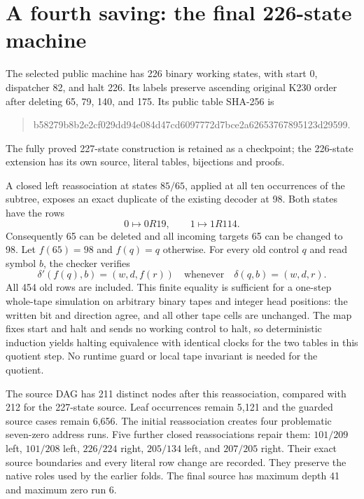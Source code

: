 \section{A fourth saving: the final 226-state machine}
\label{sec:native226}

The selected public machine has 226 binary working states, with start 0,
dispatcher 82, and halt 226.  Its labels preserve ascending original K230 order
after deleting 65, 79, 140, and 175.  Its public table SHA-256 is
\begin{quote}\small\ttfamily
b58279b8b2e2cf029dd94e084d47cd6097772d7bce2a62653767895123d29599.
\end{quote}
The fully proved 227-state construction is retained as a checkpoint; the
226-state extension has its own source, literal tables, bijections and proofs.

A closed left reassociation at states $85/65$, applied at all ten occurrences
of the subtree, exposes an exact duplicate of the existing decoder at 98.
Both states have the rows
\[
 0\longmapsto 0R19,\qquad 1\longmapsto1R114.
\]
Consequently 65 can be deleted and all incoming targets 65 can be changed to
98.  Let $f(65)=98$ and $f(q)=q$ otherwise.  For every old control $q$ and read
symbol $b$, the checker verifies
\[
 \delta'(f(q),b)=(w,d,f(r))
 \quad\text{whenever}\quad \delta(q,b)=(w,d,r).
\]
All 454 old rows are included.  This finite equality is sufficient for a
one-step whole-tape simulation on arbitrary binary tapes and integer head
positions: the written bit and direction agree, and all other tape cells are
unchanged.  The map fixes start and halt and sends no working control to halt,
so deterministic induction yields halting equivalence with identical clocks
for the two tables in this quotient step.  No runtime guard or local tape
invariant is needed for the quotient.

The source DAG has 211 distinct nodes after this reassociation, compared with
212 for the 227-state source.  Leaf occurrences remain 5,121 and the guarded
source cases remain 6,656.  The initial reassociation creates four problematic
seven-zero address runs.  Five further closed reassociations repair them:
$101/209$ left, $101/208$ left, $226/224$ right, $205/134$ left, and $207/205$
right.  Their exact source boundaries and every literal row change are
recorded.  They preserve the native roles used by the earlier folds.  The final
source has maximum depth 41 and maximum zero run 6.

